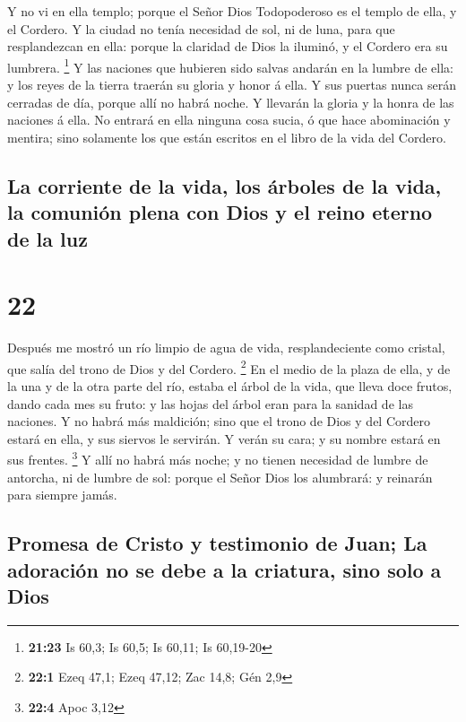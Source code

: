  Y no vi en ella templo; porque el Señor Dios Todopoderoso
es el templo de ella, y el Cordero.  Y la ciudad no tenía
necesidad de sol, ni de luna, para que resplandezcan en ella: porque la
claridad de Dios la iluminó, y el Cordero era su lumbrera. \footnote{\textbf{21:23}
  Is 60,3; Is 60,5; Is 60,11; Is 60,19-20}  Y las naciones
que hubieren sido salvas andarán en la lumbre de ella: y los reyes de la
tierra traerán su gloria y honor á ella.  Y sus puertas
nunca serán cerradas de día, porque allí no habrá noche.  Y
llevarán la gloria y la honra de las naciones á ella.  No
entrará en ella ninguna cosa sucia, ó que hace abominación y mentira;
sino solamente los que están escritos en el libro de la vida del
Cordero.

\hypertarget{la-corriente-de-la-vida-los-uxe1rboles-de-la-vida-la-comuniuxf3n-plena-con-dios-y-el-reino-eterno-de-la-luz}{%
\subsection{La corriente de la vida, los árboles de la vida, la comunión
plena con Dios y el reino eterno de la
luz}\label{la-corriente-de-la-vida-los-uxe1rboles-de-la-vida-la-comuniuxf3n-plena-con-dios-y-el-reino-eterno-de-la-luz}}

\hypertarget{section-21}{%
\section{22}\label{section-21}}

 Después me mostró un río limpio de agua de vida,
resplandeciente como cristal, que salía del trono de Dios y del Cordero.
\footnote{\textbf{22:1} Ezeq 47,1; Ezeq 47,12; Zac 14,8; Gén 2,9}
 En el medio de la plaza de ella, y de la una y de la otra
parte del río, estaba el árbol de la vida, que lleva doce frutos, dando
cada mes su fruto: y las hojas del árbol eran para la sanidad de las
naciones.  Y no habrá más maldición; sino que el trono de
Dios y del Cordero estará en ella, y sus siervos le servirán.
 Y verán su cara; y su nombre estará en sus frentes.
\footnote{\textbf{22:4} Apoc 3,12}  Y allí no habrá más
noche; y no tienen necesidad de lumbre de antorcha, ni de lumbre de sol:
porque el Señor Dios los alumbrará: y reinarán para siempre jamás.

\hypertarget{promesa-de-cristo-y-testimonio-de-juan-la-adoraciuxf3n-no-se-debe-a-la-criatura-sino-solo-a-dios}{%
\subsection{Promesa de Cristo y testimonio de Juan; La adoración no se
debe a la criatura, sino solo a
Dios}\label{promesa-de-cristo-y-testimonio-de-juan-la-adoraciuxf3n-no-se-debe-a-la-criatura-sino-solo-a-dios}}

